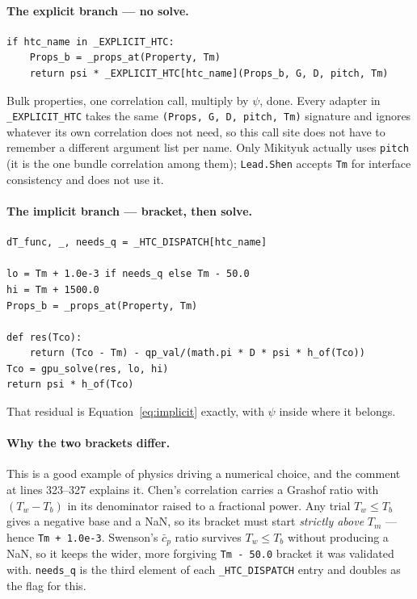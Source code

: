 \documentclass[11pt]{article}
\newcommand{\code}[1]{\texttt{#1}}
\begin{document}
\paragraph{The explicit branch --- no solve.}
\begin{lstlisting}
if htc_name in _EXPLICIT_HTC:
    Props_b = _props_at(Property, Tm)
    return psi * _EXPLICIT_HTC[htc_name](Props_b, G, D, pitch, Tm)
\end{lstlisting}
Bulk properties, one correlation call, multiply by $\psi$, done. Every adapter in
\code{\_EXPLICIT\_HTC} takes the same \code{(Props, G, D, pitch, Tm)} signature and
ignores whatever its own correlation does not need, so this call site does not have to
remember a different argument list per name. Only Mikityuk actually uses \code{pitch}
(it is the one bundle correlation among them); \code{Lead.Shen} accepts \code{Tm} for
interface consistency and does not use it.

\paragraph{The implicit branch --- bracket, then solve.}
\begin{lstlisting}
dT_func, _, needs_q = _HTC_DISPATCH[htc_name]

lo = Tm + 1.0e-3 if needs_q else Tm - 50.0
hi = Tm + 1500.0
Props_b = _props_at(Property, Tm)

def res(Tco):
    return (Tco - Tm) - qp_val/(math.pi * D * psi * h_of(Tco))
Tco = gpu_solve(res, lo, hi)
return psi * h_of(Tco)
\end{lstlisting}

That residual is Equation~\eqref{eq:implicit} exactly, with $\psi$ inside where it
belongs.

\paragraph{Why the two brackets differ.} This is a good example of physics driving a
numerical choice, and the comment at lines 323--327 explains it. Chen's correlation
carries a Grashof ratio with $(T_w - T_b)$ in its denominator raised to a fractional
power. Any trial $T_w \le T_b$ gives a negative base and a NaN, so its bracket must start
\emph{strictly above} $T_m$ --- hence \code{Tm + 1.0e-3}. Swenson's $\bar c_p$ ratio
survives $T_w \le T_b$ without producing a NaN, so it keeps the wider, more forgiving
\code{Tm - 50.0} bracket it was validated with. \code{needs\_q} is the third element of
each \code{\_HTC\_DISPATCH} entry and doubles as the flag for this.
\end{document}
